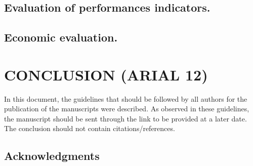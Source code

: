 \documentclass[
	article,			%
	12pt,				%
	oneside,			%
	a4paper,			%
	english,			%
	brazil,				%
	sumario=tradicional
	]{abntex2}
\begin{document}
\subsection{\textbf{Evaluation of performances indicators.}}
\subsection{\textbf{Economic evaluation.}}


% 

\section{\textbf{CONCLUSION (ARIAL 12)}}

In this document, the guidelines that should be followed by all authors for the publication of the manuscripts were described. As observed in these guidelines, the manuscript should be sent through the link to be provided at a later date.
The conclusion should not contain citations/references.


\subsection*{\textbf{Acknowledgments}}



\postextual

\vspace*{1.5cm}




\end{document}
